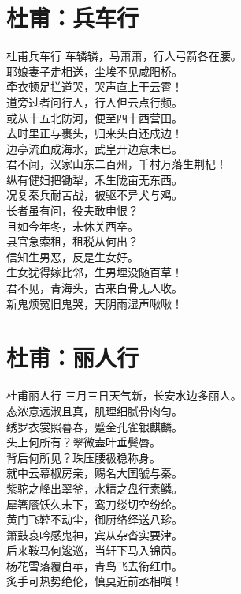 \documentclass[12pt,oneside,a5paper]{book}
\begin{document}
\chapter{杜甫：兵车行}
\begin{poemzh}{杜甫}{兵车行}
车辚辚，马萧萧，行人弓箭各在腰。\\
耶娘妻子走相送，尘埃不见咸阳桥。\\
牵衣顿足拦道哭，哭声直上干云霄！\\
道旁过者问行人，行人但云点行频。\\
或从十五北防河，便至四十西营田。\\
去时里正与裹头，归来头白还戍边！\\
边亭流血成海水，武皇开边意未已。\\
君不闻，汉家山东二百州，千村万落生荆杞！\\
纵有健妇把锄犁，禾生陇亩无东西。\\
况复秦兵耐苦战，被驱不异犬与鸡。\\
长者虽有问，役夫敢申恨？\\
且如今年冬，未休关西卒。\\
县官急索租，租税从何出？\\
信知生男恶，反是生女好。\\
生女犹得嫁比邻，生男埋没随百草！\\
君不见，青海头，古来白骨无人收。\\
新鬼烦冤旧鬼哭，天阴雨湿声啾啾！\\ 
\end{poemzh}

\chapter{杜甫：丽人行}
\begin{poemzh}{杜甫}{丽人行}
三月三日天气新，长安水边多丽人。\\
态浓意远淑且真，肌理细腻骨肉匀。\\
绣罗衣裳照暮春，蹙金孔雀银麒麟。\\
头上何所有？翠微盍叶垂鬓唇。\\
背后何所见？珠压腰衱稳称身。\\
就中云幕椒房亲，赐名大国虢与秦。\\
紫驼之峰出翠釜，水精之盘行素鳞。\\
犀箸餍饫久未下，鸾刀缕切空纷纶。\\
黄门飞鞚不动尘，御厨络绎送八珍。\\
箫鼓哀吟感鬼神，宾从杂沓实要津。\\
后来鞍马何逡巡，当轩下马入锦茵。\\
杨花雪落覆白苹，青鸟飞去衔红巾。\\
炙手可热势绝伦，慎莫近前丞相嗔！\\ 
\end{poemzh}
\end{document}
